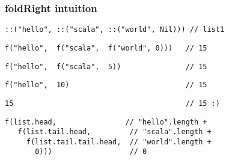 \documentclass[include/preamble.tex]{subfiles}
\begin{document}
\begin{frame}[fragile]
  \frametitle{foldRight intuition}
  \begin{center}
    \lstset{aboveskip=0pt,belowskip=0pt}
    \begin{lstlisting}[style=scala]
::("hello", ::("scala", ::("world", Nil))) // list1
    \end{lstlisting}
    \pause
    \vspace{1em}
    \begin{lstlisting}[style=scala]
 f("hello",  f("scala",  f("world", 0)))   // 15
    \end{lstlisting}
    \pause
    \begin{lstlisting}[style=scala]
 f("hello",  f("scala",  5))               // 15
    \end{lstlisting}
    \pause
    \begin{lstlisting}[style=scala]
 f("hello",  10)                           // 15
    \end{lstlisting}
    \pause
    \begin{lstlisting}[style=scala]
 15                                        // 15 :)
    \end{lstlisting}
    \pause
    \vspace{1em}
    \begin{lstlisting}[style=scala]
 f(list.head,                // "hello".length +
   f(list.tail.head,         // "scala".length +
     f(list.tail.tail.head,  // "world".length +
       0)))                  // 0
    \end{lstlisting}
  \end{center}
\end{frame}
\end{document}
